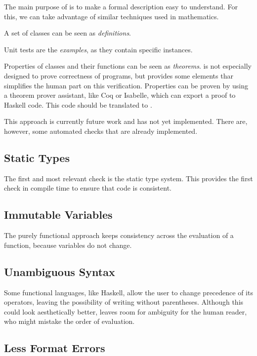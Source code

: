 The main purpose of \Soda is to make a formal description easy to understand.
For this, we can take advantage of similar techniques used in mathematics.

A set of \Soda classes can be seen as \textit{definitions}.

Unit tests are the \textit{examples}, as they contain specific instances.

Properties of classes and their functions can be seen as \textit{theorems}.
\Soda is not especially designed to prove correctness of programs, but provides some elements thar simplifies the human part on this verification.
Properties can be proven by using a theorem prover assistant, like Coq or Isabelle, which can export a proof to Haskell code.
This code should be translated to \Soda.

This approach is currently future work and has not yet implemented.
There are, however, some automated checks that are already implemented.

\subsection{Static Types}

The first and most relevant check is the static type system.
This provides the first check in compile time to ensure that \Soda code is consistent.

\subsection{Immutable Variables}

The purely functional approach keeps consistency across the evaluation of a function, because variables do not change.

\subsection{Unambiguous Syntax}

Some functional languages, like Haskell, allow the user to change precedence of its operators, leaving the possibility of writing without parentheses.
Although this could look aesthetically better, leaves room for ambiguity for the human reader, who might mistake the order of evaluation.

\subsection{Less Format Errors}

